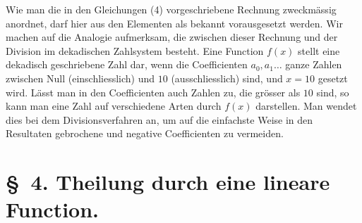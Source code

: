 \documentclass[11pt]{article}
\begin{document}
Wie man die in den Gleichungen (4) vorgeschriebene Rechnung zweckmässig anordnet, darf hier aus den Elementen als bekannt vorausgesetzt werden. Wir machen auf die Analogie aufmerksam, die zwischen dieser Rechnung und der Division im dekadischen Zahlsystem besteht. Eine Function $f(x)$ stellt eine dekadisch geschriebene Zahl dar, wenn die Coefficienten $a_0,a_1\ldots$ ganze Zahlen zwischen Null (einschliesslich) und $10$ (ausschliesslich) sind, und $x=10$ gesetzt wird. Lässt man in den Coefficienten auch Zahlen zu, die grösser als $10$ sind, so kann man eine Zahl auf verschiedene Arten durch $f(x)$ darstellen. Man wendet dies bei dem Divisionsverfahren an, um auf die einfachste Weise in den Resultaten gebrochene und negative Coefficienten zu vermeiden.

\section*{\S~4. Theilung durch eine lineare Function.}
\end{document}
